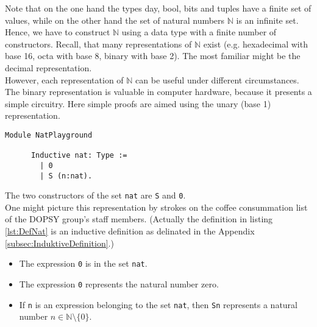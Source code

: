 	  Note that on the one hand the types day, bool, bits and tuples have a finite set of values, while on the other hand the set of natural numbers $\mathbb{N}$ is an infinite set.\\ 
	  Hence, we have to construct $\mathbb{N}$ using a data type with a finite number of constructors. 
	  Recall, that many representations of $\mathbb{N}$ exist (e.g. hexadecimal with base 16, octa with base 8, binary with base 2).
	  The most familiar might be the decimal representation.\\
	  However, each representation of $\mathbb{N}$ can be useful under different circumstances. 
	  The binary representation is valuable in computer hardware, because it presents a simple circuitry.
	  Here simple proofs are aimed using the unary (base 1) representation.
	  
	  \begin{lstlisting}[caption={\lstinline!nat!}, label=lst:DefNat]
	  Module NatPlayground
	  
	  Inductive nat: Type :=
	    | 0
	    | S (n:nat).
	  \end{lstlisting}  
	  The two constructors of the set \lstinline!nat! are \lstinline!S! and \lstinline!0!. \\
	
	 One might picture this representation by strokes on the coffee consummation list of the DOPSY group's staff members.  
	 (Actually the definition in listing \ref{lst:DefNat} is an inductive definition as delinated in the Appendix \ref{subsec:InduktiveDefinition}.)	  
	  \begin{itemize}
	  \item The expression \lstinline!0! is in the set \lstinline!nat!.
	  \item The expression \lstinline!0! represents the natural number zero. 
	  \item If \lstinline!n! is an expression belonging to the set \lstinline!nat!, then \lstinline!Sn! represents a natural number $n\in\mathbb{N}\setminus\{ 0\}$.  
	  \end{itemize}	  
	  
